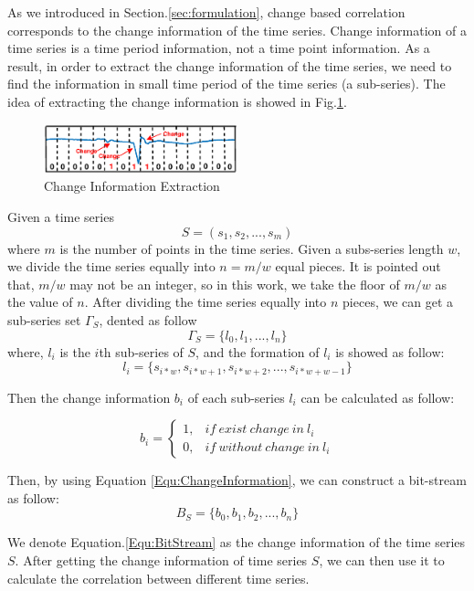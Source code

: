 As we introduced in Section.\ref{sec:formulation}, change based correlation corresponds to the change information of the time series. 
Change information of a time series is a time period information, not a time point information. 
As a result, in order to extract the change information of the time series, we need to find the information in small time period of the time series (a sub-series). 
The idea of extracting the change information is showed in Fig.\ref{fig:ChangeMapping}.

\begin{figure}[t]
\centering
\includegraphics[width=0.5\textwidth]{changeExtraction.eps}
\caption{Change Information Extraction}
\label{fig:ChangeMapping}
\end{figure}

Given a time series 
\[S = (s_1,s_2,...,s_m)\]
where $m$ is the number of points in the time series.
Given a subs-series length $w$, we divide the time series equally into $n = m/w$ equal pieces. It is pointed out that, $m/w$ may not be an integer, so in this work, we take the floor of $m/w$ as the value of $n$.
After dividing the time series equally into $n$ pieces, we can get a sub-series set $\Gamma_S$, dented as follow
\[\Gamma_S = \{l_0,l_1,...,l_n\}\]
where, $l_i$ is the $i$th sub-series of $S$, and the formation of $l_i$ is showed as follow:
\[l_i = \{s_{i*w},s_{i*w+1},s_{i*w+2},...,s_{i*w+w-1}\}\]

Then the change information $b_i$ of each sub-series $l_i$ can be calculated as follow:

\begin{equation}
\label{Equ:ChangeInformation}
b_i = \left\{\begin{matrix}
1, & if~exist~change~in~l_i
\\ 
0, & if~without~change~in~l_i
\end{matrix}\right.
\end{equation}

Then, by using Equation \ref{Equ:ChangeInformation}, we can construct a bit-stream as follow:
\begin{equation}
\label{Equ:BitStream}
B_S = \{b_0,b_1,b_2,...,b_n\}
\end{equation}

We denote Equation.\ref{Equ:BitStream} as the change information of the time series $S$. After getting the change information of time series $S$, we can then use it to calculate the correlation between different time series.

